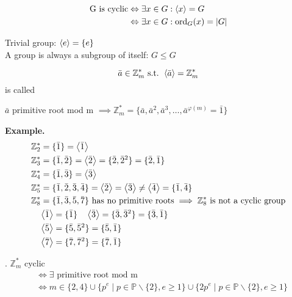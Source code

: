 \begin{align*}
  \text{G is cyclic} & \Leftrightarrow \exists x \in G: \left\langle x \right\rangle = G \\
                     & \Leftrightarrow \exists x \in G: \operatorname{ord}_G(x) = |G|
\end{align*}

Trivial group: $\left\langle e \right\rangle = \{e\}$\\
A group is always a subgroup of itself: $G \leq G$

\begin{definition}
  \[
    \bar{a} \in \mathbb{Z}_m^{*} \text{ s.t. } \left\langle \bar{a} \right\rangle = \mathbb{Z}_m^{*}
\]
is called 

$\bar{a}$ primitive root mod m
$\implies \mathbb{Z}_m^{*} = \{\bar{a}, \bar{a}^2, \bar{a}^3, \ldots, \bar{a}^{\varphi(m)} =\bar{1} \}$
\end{definition}

\textbf{Example.}
\begin{align*}
  &\mathbb{Z}_2^{*} = \{\bar{1}\} = \left\langle \bar{1} \right\rangle \\
  &\mathbb{Z}_3^{*} = \{\bar{1}, \bar{2}\} = \left\langle \bar{2} \right\rangle
    = \{\bar{2}, \bar{2}^2 \} = \{\bar{2}, \bar{1}\}\\
  &\mathbb{Z}_4^{*} = \{\bar{1}, \bar{3}\} = \left\langle \bar{3} \right\rangle \\
  &\mathbb{Z}_5^{*} = \{\bar{1}, \bar{2}, \bar{3}, \bar{4}\}
    = \left\langle \bar{2} \right\rangle = \left\langle \bar{3} \right\rangle \neq \left\langle \bar{4} \right\rangle
    = \{\bar{1}, \bar{4}\} \\
  &\mathbb{Z}_8^{*} = \{\bar{1}, \bar{3}, \bar{5}, \bar{7}\} \text{ has no primitive roots} \implies \mathbb{Z}_8^{*}\text{ is not a cyclic group} \\
  & \quad \left\langle \bar{1} \right\rangle = \{\bar{1}\} \quad \left\langle \bar{3} \right\rangle=\{\bar{3}, \bar{3}^2\}=\{\bar{3}, \bar{1}\} \\
  & \quad \left\langle \bar{5} \right\rangle=\{\bar{5}, \bar{5}^2\}=\{\bar{5}, \bar{1}\} \\
  & \quad \left\langle \bar{7} \right\rangle=\{\bar{7}, \bar{7}^2\}=\{\bar{7}, \bar{1}\}
\end{align*}

\Theorem.
$\mathbb{Z}_m^{*}$ cyclic
\begin{align*}
  & \Leftrightarrow \exists \text{ primitive root mod m} \\
  & \Leftrightarrow m \in \{2,4\} \cup \{ p^e \mid p \in \mathbb{P} \backslash \{2\}, e \geq 1 \} \cup \{ 2p^e \mid p \in \mathbb{P} \backslash \{2\}, e \geq 1 \}
\end{align*}

